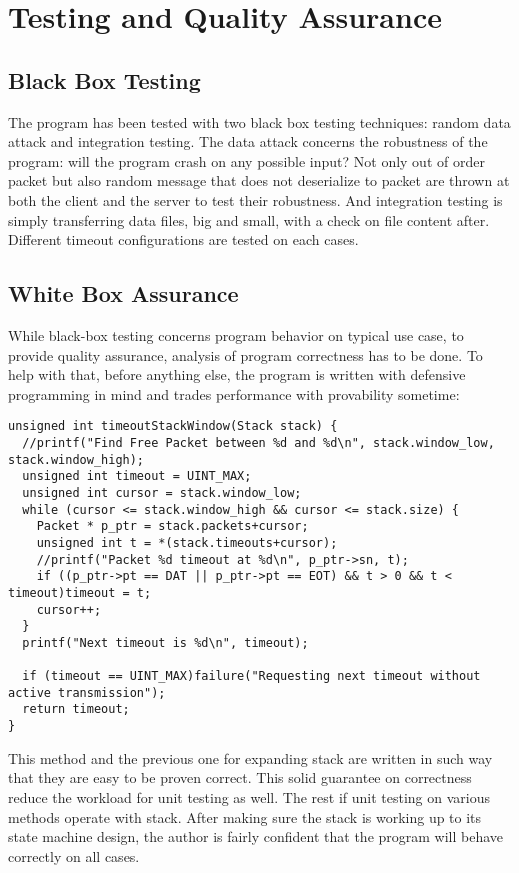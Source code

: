 \documentclass[12pt]{article}
\begin{document}
\section{Testing and Quality Assurance}
\subsection{Black Box Testing}
The program has been tested with two black box testing techniques: random data attack and integration testing. The data attack concerns the robustness of the program: will the program crash on any possible input? Not only out of order packet but also random message that does not deserialize to packet are thrown at both the client and the server to test their robustness. And integration testing is simply transferring data files, big and small, with a check on file content after. Different timeout configurations are tested on each cases.

\subsection{White Box Assurance}
While black-box testing concerns program behavior on typical use case, to provide quality assurance, analysis of program correctness has to be done. To help with that, before anything else, the program is written with defensive programming in mind and trades performance with provability sometime:
\begin{samepage}
\begin{verbatim}
unsigned int timeoutStackWindow(Stack stack) {
  //printf("Find Free Packet between %d and %d\n", stack.window_low, stack.window_high);
  unsigned int timeout = UINT_MAX;
  unsigned int cursor = stack.window_low;
  while (cursor <= stack.window_high && cursor <= stack.size) {
    Packet * p_ptr = stack.packets+cursor;
    unsigned int t = *(stack.timeouts+cursor);
    //printf("Packet %d timeout at %d\n", p_ptr->sn, t);
    if ((p_ptr->pt == DAT || p_ptr->pt == EOT) && t > 0 && t < timeout)timeout = t;
    cursor++;
  }
  printf("Next timeout is %d\n", timeout);
  
  if (timeout == UINT_MAX)failure("Requesting next timeout without active transmission");
  return timeout;
}
\end{verbatim}
\end{samepage}
This method and the previous one for expanding stack are written in such way that they are easy to be proven correct. This solid guarantee on correctness reduce the workload for unit testing as well. The rest if unit testing on various methods operate with stack. After making sure the stack is working up to its state machine design, the author is fairly confident that the program will behave correctly on all cases.
\end{document}
